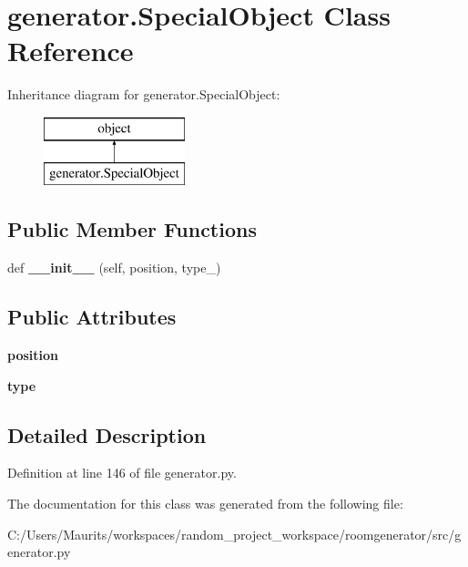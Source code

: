 \hypertarget{classgenerator_1_1_special_object}{}\section{generator.\+Special\+Object Class Reference}
\label{classgenerator_1_1_special_object}
Inheritance diagram for generator.\+Special\+Object\+:\begin{figure}[H]
\begin{center}
\leavevmode
\includegraphics[height=2.000000cm]{classgenerator_1_1_special_object}
\end{center}
\end{figure}
\subsection*{Public Member Functions}
\begin{DoxyCompactItemize}
\item 
\hypertarget{classgenerator_1_1_special_object_ab3bc507b80aecc5d75b89934e95353a9}{}def {\bfseries \+\_\+\+\_\+init\+\_\+\+\_\+} (self, position, type\+\_\+)\label{classgenerator_1_1_special_object_ab3bc507b80aecc5d75b89934e95353a9}

\end{DoxyCompactItemize}
\subsection*{Public Attributes}
\begin{DoxyCompactItemize}
\item 
\hypertarget{classgenerator_1_1_special_object_a3ee3f52af5d37d7d5b1e0b5c32295b61}{}{\bfseries position}\label{classgenerator_1_1_special_object_a3ee3f52af5d37d7d5b1e0b5c32295b61}

\item 
\hypertarget{classgenerator_1_1_special_object_afbf1f165e38f8ecdadb9f18a0c48e2c0}{}{\bfseries type}\label{classgenerator_1_1_special_object_afbf1f165e38f8ecdadb9f18a0c48e2c0}

\end{DoxyCompactItemize}


\subsection{Detailed Description}


Definition at line 146 of file generator.\+py.



The documentation for this class was generated from the following file\+:\begin{DoxyCompactItemize}
\item 
C\+:/\+Users/\+Maurits/workspaces/random\+\_\+project\+\_\+workspace/roomgenerator/src/generator.\+py\end{DoxyCompactItemize}
